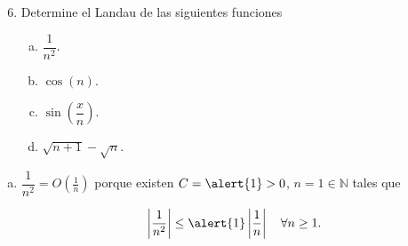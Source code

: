 \documentclass[
	spanish,
	8pt,
	utf8,
	xcolor=table,
	handout,
	aspectratio=169,
	professionalfonts,
	mathserif,
	leqno,
]{beamer}
\begin{document}
\begin{frame}
	\begin{enumerate}\setcounter{enumi}{5}
		\item
		      Determine el Landau de las siguientes funciones

		      \begin{multicols}{4}
			      \begin{enumerate}[a)]

				      \item

				            \begin{math}
					            \dfrac{1}{n^{2}}.
				            \end{math}

				      \item

				            \begin{math}
					            \cos\left(n\right).
				            \end{math}


				      \item

				            \begin{math}
					            \sin\left(\dfrac{x}{n}\right).
				            \end{math}

				      \item

				            \begin{math}
					            \sqrt{n+1}-\sqrt{n}.
				            \end{math}
			      \end{enumerate}
		      \end{multicols}

	\end{enumerate}

	\begin{solution}
		\begin{enumerate}[a)]

			\item

			      \begin{math}
				      \dfrac{1}{n^{2}}=
				      O\left(\frac{1}{n}\right)
			      \end{math}
			      porque existen $C=\alert{1}>0$, $n=1\in\mathbb{N}$ tales
			      que

			      \begin{equation*}
				      \left|
				      \frac{1}{n^{2}}
				      \right|\leq
				      \alert{1}\left|
				      \frac{1}{n}
				      \right|\quad
				      \forall n\geq 1.
			      \end{equation*}


\end{enumerate}
\end{solution}
\end{frame}
\end{document}
